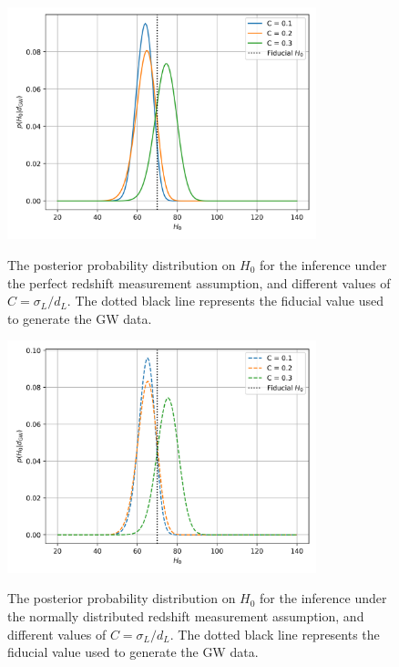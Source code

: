 \documentclass[%
preprint,
nofootinbib,
 amsmath,amssymb,
 aps,
]{revtex4-2}
\begin{document}
\begin{figure}[!ht]
	\caption{The posterior probability distribution on $H_0$ for the inference under the perfect redshift measurement assumption,
		and different values of $C=\sigma_L / d_L$. The dotted black line represents the fiducial value used to generate the GW data.}
	\centering
	\includegraphics[width=0.8\textwidth]{../src/figures/perfect-redshift-posterior.png}
	\label{fig:perfect-redshift-posterior}
\end{figure}

\begin{figure}[!ht]
	\caption{The posterior probability distribution on $H_0$ for the inference under the normally distributed redshift measurement assumption,
		and different values of $C=\sigma_L / d_L$. The dotted black line represents the fiducial value used to generate the GW data.}
	\centering
	\includegraphics[width=0.8\textwidth]{../src/figures/full-inference-posterior.png}
	\label{fig:full-inference-posterior}
\end{figure}
\end{document}
